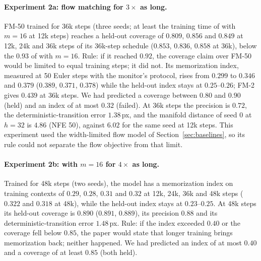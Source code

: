 \paragraph{Experiment 2a: flow matching for $3\times$ as long.} FM-50 trained for 36k steps (three seeds; at least the training time of \imlewm{} with $m{=}16$ at 12k steps) reaches a held-out coverage of $0.809$, $0.856$ and $0.849$ at 12k, 24k and 36k steps of its 36k-step schedule ($0.853$, $0.836$, $0.858$ at 36k), below the $0.93$ of \imlewm{} with $m{=}16$. Rule: if it reached $0.92$, the coverage claim over FM-50 would be limited to equal training steps; it did not. Its memorization index, measured at 50 Euler steps with the monitor's protocol, rises from $0.299$ to $0.346$ and $0.379$ ($0.389$, $0.371$, $0.378$) while the held-out index stays at $0.25$--$0.26$; FM-2 gives $0.439$ at 36k steps. We had predicted a coverage between $0.80$ and $0.90$ (held) and an index of at most $0.32$ (failed). At 36k steps the precision is $0.72$, the deterministic-transition error $1.38$\,px, and the manifold distance of seed 0 at $h{=}32$ is $4.86$ (NFE 50), against $6.02$ for the same seed at 12k steps. This experiment used the width-limited flow model of Section~\ref{sec:baselines}, so its rule could not separate the flow objective from that limit.

\paragraph{Experiment 2b: \imlewm{} with $m{=}16$ for $4\times$ as long.} Trained for 48k steps (two seeds), the model has a memorization index on training contexts of $0.29$, $0.28$, $0.31$ and $0.32$ at 12k, 24k, 36k and 48k steps ($0.322$ and $0.318$ at 48k), while the held-out index stays at $0.23$--$0.25$. At 48k steps its held-out coverage is $0.890$ ($0.891$, $0.889$), its precision $0.88$ and its deterministic-transition error $1.48$\,px. Rule: if the index exceeded $0.40$ or the coverage fell below $0.85$, the paper would state that longer training brings memorization back; neither happened. We had predicted an index of at most $0.40$ and a coverage of at least $0.85$ (both held).

